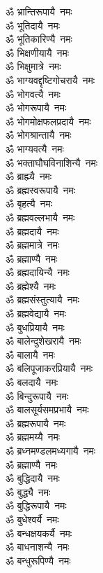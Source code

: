 \begin{flushleft}
\begin{multicols}{2}
ॐ भ्रान्तिरूपायै~नमः\\
ॐ भूतिदायै~नमः\\
ॐ भूतिकारिण्यै~नमः\\
ॐ भिक्षणीयायै~नमः\\
ॐ भिक्षुमात्रे~नमः\\
ॐ भाग्यवद्दृष्टिगोचरायै~नमः\\
ॐ भोगवत्यै~नमः\\
ॐ भोगरूपायै~नमः\\
ॐ भोगमोक्षफलप्रदायै~नमः\\
ॐ भोगश्रान्तायै~नमः\hfill{}\\
ॐ भाग्यवत्यै~नमः\\
ॐ भक्ताघौघविनाशिन्यै~नमः\\
ॐ ब्राह्म्यै~नमः\\
ॐ ब्रह्मस्वरूपायै~नमः\\
ॐ बृहत्यै~नमः\\
ॐ ब्रह्मवल्लभायै~नमः\\
ॐ ब्रह्मदायै~नमः\\
ॐ ब्रह्ममात्रे~नमः\\
ॐ ब्रह्माण्यै~नमः\\
ॐ ब्रह्मदायिन्यै~नमः\hfill{}\\
ॐ ब्रह्मेश्यै~नमः\\
ॐ ब्रह्मसंस्तुत्यायै~नमः\\
ॐ ब्रह्मवेद्यायै~नमः\\
ॐ बुधप्रियायै~नमः\\
ॐ बालेन्दुशेखरायै~नमः\\
ॐ बालायै~नमः\\
ॐ बलिपूजाकरप्रियायै~नमः\\
ॐ बलदायै~नमः\\
ॐ बिन्दुरूपायै~नमः\\
ॐ बालसूर्यसमप्रभायै~नमः\hfill{}\\
ॐ ब्रह्मरूपायै~नमः\\
ॐ ब्रह्ममय्यै~नमः\\
ॐ ब्रध्नमण्डलमध्यगायै~नमः\\
ॐ ब्रह्माण्यै~नमः\\
ॐ बुद्धिदायै~नमः\\
ॐ बुद्ध्यै~नमः\\
ॐ बुद्धिरूपायै~नमः\\
ॐ बुधेश्वर्यै~नमः\\
ॐ बन्धक्षयकर्यै~नमः\\
ॐ बाधनाशन्यै~नमः\hfill{}\\
ॐ बन्धुरूपिण्यै~नमः\\

\end{multicols}
\end{flushleft}

